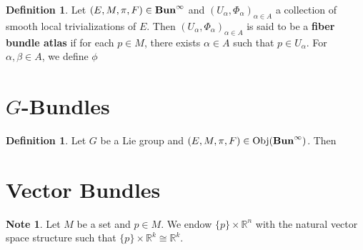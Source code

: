 \documentclass{book}
\theoremstyle{definition}
\newtheorem{defn}[definition]{Definition}
\newtheorem{note}[definition]{Note}
\newcommand{\al}{\alpha}
\newcommand{\be}{\beta}
\newcommand{\R}{\mathbb{R}}
\DeclareMathOperator{\Obj}{Obj}
\DeclareMathOperator*{\Buninf}{\text{\tbf{Bun}}^{\infty}}
\DeclareMathOperator*{\0}{\mbf{0}}
\DeclareMathOperator*{\1}{\mbf{1}}
\newcommand{\tbf}[1]{\textbf{#1}}
\begin{document}
	\begin{defn}
		Let $(E, M, \pi, F) \in \Buninf$ and $(U_{\al}, \Phi_{\al})_{\al \in A}$ a collection of smooth local trivializations of $E$. Then $(U_{\al}, \Phi_{\al})_{\al \in A}$ is said to be a \tbf{fiber bundle atlas} if for each $p \in M$, there exists $\al \in A$ such that $p \in U_{\al}$. For $\al, \be \in A$, we define $\phi_{}$
	\end{defn}




























\newpage
\section{$G$-Bundles}

\begin{defn}
	Let $G$ be a Lie group and $(E, M, \pi, F) \in \Obj(\Buninf)$. Then  
\end{defn}


	































	\newpage
	\section{Vector Bundles}

	\begin{note}
		Let $M$ be a set and $p \in M$. We endow $\{p\} \times \R^n$ with the natural vector space structure such that $\{p\} \times \R^k \cong \R^k$.
	\end{note}
\end{document}
